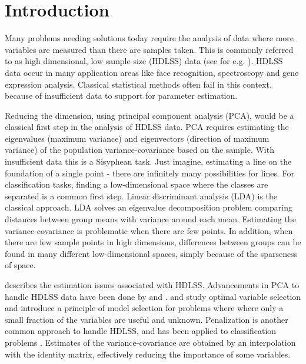 \section{Introduction} 

Many problems needing solutions today require the analysis of data where more variables are measured than there are samples taken. This is commonly referred to as high dimensional, low sample size (HDLSS) data (see for e.g. \cite{hall:2005}).   
HDLSS data occur in many application areas like face recognition, spectroscopy  and gene expression analysis. Classical statistical methods often fail in this context, because of insufficient data to support for parameter estimation. 

Reducing the dimension, using principal component analysis (PCA), would be a classical first step in the analysis of HDLSS data. PCA requires estimating the eigenvalues (maximum variance) and eigenvectors (direction of maximum variance) of the population variance-covariance based on the sample. With insufficient data this is a Sisyphean task. Just imagine, estimating a line on the foundation of a single point - there are infinitely many possibilities for lines. For classification tasks, finding a low-dimensional space where the classes are separated is a common first step. Linear discriminant analysis (LDA) is the classical approach. LDA solves an eigenvalue decomposition problem comparing distances between group means with variance around each mean. Estimating the variance-covariance is problematic when there are few points. In addition, when there are few sample points in high dimensions, differences between groups can be found in many different low-dimensional spaces, simply because of the sparseness of space.

\cite{marron:2007} describes the estimation issues associated with HDLSS.  
Advancements in PCA to handle HDLSS data have been done by \cite{marron:2011} and \cite{yata:2010}. \cite{donoho:2009} and \cite{donoho:2008} study optimal variable selection and introduce a principle of model selection for problems where where only a small fraction of the variables are useful and unknown. Penalization is another common approach to handle HDLSS, and has been applied to classification problems \citep[e.g.][]{witten:2011, lee:2009}. Estimates of the variance-covariance are obtained by an interpolation with the identity matrix, effectively reducing the importance of some variables. 

